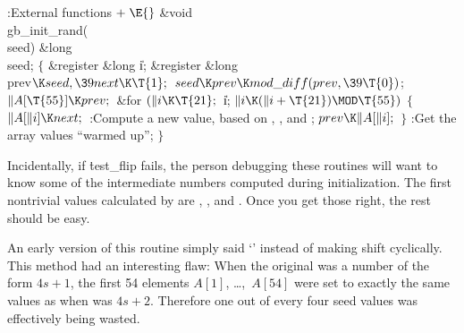 \Y\B\4:External functions\X${}\mathrel+\E{}$\6
\1\1\&{void} \\{gb\_init\_rand}(\\{seed})\6
\&{long} \\{seed};\2\2\6
${}\{{}$\5
\1\&{register} \&{long} \|i;\6
\&{register} \&{long} \\{prev}${}\K\\{seed},\39\\{next}\K\T{1};{}$\7
${}\\{seed}\K\\{prev}\K\\{mod\_diff}(\\{prev},\39\T{0}){}$;\6
${}\|A[\T{55}]\K\\{prev};{}$\6
\&{for} ${}(\|i\K\T{21};{}$ \|i; ${}\|i\K(\|i+\T{21})\MOD\T{55}){}$\5
${}\{{}$\1\6
${}\|A[\|i]\K\\{next};{}$\6
:Compute a new  value, based on , ,
and \X;\6
${}\\{prev}\K\|A[\|i];{}$\6
\4${}\}{}$\2\6
:Get the array values ``warmed up''\X;\6
\4${}\}{}$\2\par
\fi

Incidentally, if \.{test\_flip} fails, the person debugging these
routines will want to know some of the intermediate numbers computed
during initialization.  The first nontrivial values calculated by
 are , , and
.  Once you get those right, the rest should
be easy.

An early version of this routine simply said `' instead
of making
 shift cyclically. This method had an interesting flaw:
When the original  was a number of the form $4s+1$, the first
54 elements $A[1]$, \dots,~$A[54]$ were set to exactly the same values
as when  was $4s+2$. Therefore one out of every four seed values
was effectively being wasted.

